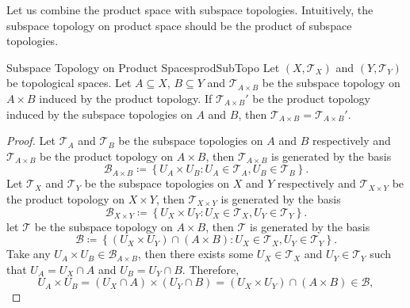 \documentclass[math]{amznotes}
\theoremstyle{remark}
\begin{document}
Let us combine the product space with subspace topologies. Intuitively, the subspace topology on product space should be the product of subspace topologies.
\begin{probox}{Subspace Topology on Product Spaces}{prodSubTopo}
    Let $\left(X, \mathcal{T}_X\right)$ and $\left(Y, \mathcal{T}_Y\right)$ be topological spaces. Let $A \subseteq X$, $B \subseteq Y$ and $\mathcal{T}_{A \times B}$ be the subspace topology on $A \times B$ induced by the product topology. If $\mathcal{T}_{A \times B}'$ be the product topology induced by the subspace topologies on $A$ and $B$, then $\mathcal{T}_{A \times B} = \mathcal{T}_{A \times B}'$.
    \tcblower
    \begin{proof}
        Let $\mathcal{T}_A$ and $\mathcal{T}_B$ be the subspace topologies on $A$ and $B$ respectively and $\mathcal{T}_{A \times B}$ be the product topology on $A \times B$, then $\mathcal{T}_{A \times B}$ is generated by the basis 
        \begin{equation*}
            \mathcal{B}_{A \times B} \coloneqq \left\{U_A \times U_B \colon U_A \in \mathcal{T}_A, U_B \in \mathcal{T}_B\right\}.
        \end{equation*}
        Let $\mathcal{T}_X$ and $\mathcal{T}_Y$ be the subspace topologies on $X$ and $Y$ respectively and $\mathcal{T}_{X \times Y}$ be the product topology on $X \times Y$, then $\mathcal{T}_{X \times Y}$ is generated by the basis
        \begin{equation*}
            \mathcal{B}_{X \times Y} \coloneqq \left\{U_X \times U_Y \colon U_X \in \mathcal{T}_X, U_Y \in \mathcal{T}_Y\right\}.
        \end{equation*}
        let $\mathcal{T}$ be the subspace topology on $A \times B$, then $\mathcal{T}$ is generated by the basis 
        \begin{equation*}
            \mathcal{B} \coloneqq \left\{\left(U_X \times U_Y\right) \cap \left(A \times B\right) \colon U_X \in \mathcal{T}_X, U_Y \in \mathcal{T}_Y\right\}.
        \end{equation*}
        Take any $U_A \times U_B \in \mathcal{B}_{A \times B}$, then there exists some $U_X \in \mathcal{T}_X$ and $U_Y \in \mathcal{T}_Y$ such that $U_A = U_X \cap A$ and $U_B = U_Y \cap B$. Therefore,
        \begin{equation*}
            U_A \times U_B = \left(U_X \cap A\right) \times \left(U_Y \cap B\right) = \left(U_X \times U_Y\right) \cap \left(A \times B\right) \in \mathcal{B},
        \end{equation*}

\end{proof}
\end{probox}
\end{document}
